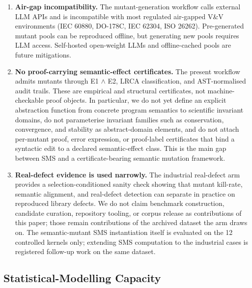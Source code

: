 \documentclass[manuscript,screen,review]{acmart}
\begin{document}
\begin{enumerate}
  semantic complexity. A portability study should validate SMS on
  industrial-grade multi-output PUTs.
\item
  \textbf{Air-gap incompatibility.} The mutant-generation workflow calls
  external LLM APIs and is incompatible with most regulated air-gapped
  V\&V environments (IEC 60880, DO-178C, IEC 62304, ISO 26262).
  Pre-generated mutant pools can be reproduced offline, but generating
  new pools requires LLM access. Self-hosted open-weight LLMs and
  offline-cached pools are future mitigations.
\item
  \textbf{No proof-carrying semantic-effect certificates.} The present
  workflow admits mutants through E1 $\wedge$ E2, LRCA classification, and
  AST-normalised audit trails. These are empirical and structural
  certificates, not machine-checkable proof objects. In particular, we
  do not yet define an explicit abstraction function from concrete
  program semantics to scientific invariant domains, do not parameterise
  invariant families such as conservation, convergence, and stability as
  abstract-domain elements, and do not attach per-mutant proof, error
  expression, or proof-label certificates that bind a syntactic edit to
  a declared semantic-effect class. This is the main gap between SMS and
  a certificate-bearing semantic mutation framework.
\item
  \textbf{Real-defect evidence is used narrowly.} The industrial
  real-defect arm provides a selection-conditioned sanity check showing
  that mutant
  kill-rate, semantic alignment, and real-defect detection can separate
  in practice on reproduced library defects. We do not claim benchmark
  construction, candidate curation,
  repository tooling, or corpus release as contributions of this paper;
  those remain contributions of the archived dataset the arm draws on.
  The semantic-mutant SMS instantiation itself is evaluated on the
  12 controlled kernels only; extending SMS computation to the
  industrial cases is registered follow-up work on the same dataset.
\end{enumerate}

\subsection{Statistical-Modelling Capacity}\label{statistical-modelling-capacity-at-n-60-cells-12-puts}
\end{document}
